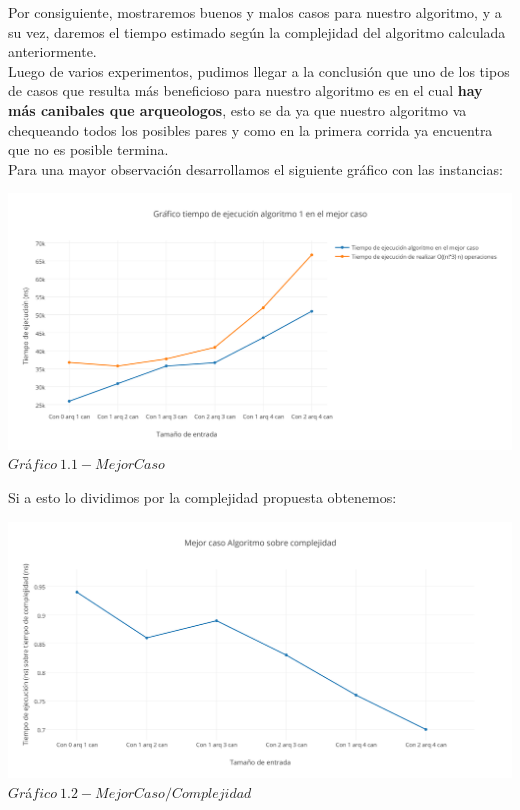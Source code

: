 \indent Por consiguiente, mostraremos buenos y malos casos para nuestro algoritmo, y a su vez, daremos el tiempo estimado 
seg\'un la complejidad del algoritmo calculada anteriormente.\\

Luego de varios experimentos, pudimos llegar a la conclusi\'on que uno de los tipos de casos que resulta m\'as beneficioso para nuestro algoritmo
es en el cual \textbf{hay m\'as canibales que arqueologos}, esto se da ya que nuestro algoritmo va chequeando todos los posibles pares y como en la primera corrida ya encuentra que no es posible termina.\\

Para una mayor observaci\'on desarrollamos el siguiente gr\'afico con las instancias:\\

\vspace*{0.3cm} \vspace*{0.3cm}
  \begin{center}
 \includegraphics[scale=0.6]{./EJ1/mejorcasoej1.png}
 {$Gr$\'a$fico \ 1.1 - Mejor Caso$}
  \end{center}
  \vspace*{0.3cm}


Si a esto lo dividimos por la complejidad propuesta obtenemos:\\

\vspace*{0.3cm} \vspace*{0.3cm}
  \begin{center}
 \includegraphics[scale=0.6]{./EJ1/mejorcasoej11.png}
 {$Gr$\'a$fico \ 1.2 - Mejor Caso / Complejidad$}
  \end{center}
  \vspace*{0.3cm}

